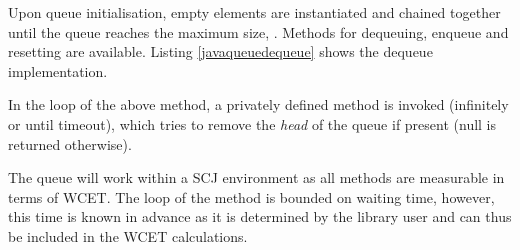 


Upon queue initialisation, empty elements are instantiated and chained together until the queue reaches the maximum size, . Methods for dequeuing, enqueue and resetting are available. Listing \ref{javaqueuedequeue} shows the dequeue implementation.



In the loop of the above method, a privately defined  method is invoked (infinitely or until timeout), which tries to remove the \textit{head} of the queue if present (null is returned otherwise).

The queue will work within a SCJ environment as all methods are measurable in terms of WCET. The loop of the  method is bounded on waiting time, however, this time is known in advance as it is determined by the library user and can thus be included in the WCET calculations.